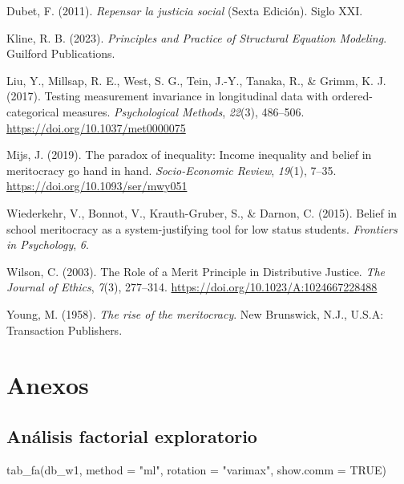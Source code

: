 \documentclass[
  12pt,
]{article}
\newenvironment{Shaded}{\begin{snugshade}}{\end{snugshade}}
\newcommand{\AttributeTok}[1]{\textcolor[rgb]{0.40,0.45,0.13}{#1}}
\newcommand{\ConstantTok}[1]{\textcolor[rgb]{0.56,0.35,0.01}{#1}}
\newcommand{\FunctionTok}[1]{\textcolor[rgb]{0.28,0.35,0.67}{#1}}
\newcommand{\NormalTok}[1]{\textcolor[rgb]{0.00,0.23,0.31}{#1}}
\newcommand{\StringTok}[1]{\textcolor[rgb]{0.13,0.47,0.30}{#1}}
\newlength{\cslhangindent}
\newenvironment{CSLReferences}[2] %
 {\begin{list}{}{%
  \setlength{\itemindent}{0pt}
  \setlength{\leftmargin}{0pt}
  \setlength{\parsep}{0pt}
  \ifodd #1
   \setlength{\leftmargin}{\cslhangindent}
   \setlength{\itemindent}{-1\cslhangindent}
  \fi
  \setlength{\itemsep}{#2\baselineskip}}}
 {\end{list}}
\begin{document}
\begin{CSLReferences}{1}{0}
Dubet, F. (2011). \emph{{Repensar la justicia social}} (Sexta
Edici{ó}n). Siglo XXI.

Kline, R. B. (2023). \emph{Principles and {Practice} of {Structural
Equation Modeling}}. Guilford Publications.

Liu, Y., Millsap, R. E., West, S. G., Tein, J.-Y., Tanaka, R., \& Grimm,
K. J. (2017). Testing measurement invariance in longitudinal data with
ordered-categorical measures. \emph{Psychological Methods},
\emph{22}(3), 486--506. \url{https://doi.org/10.1037/met0000075}

Mijs, J. (2019). The paradox of inequality: Income inequality and belief
in meritocracy go hand in hand. \emph{Socio-Economic Review},
\emph{19}(1), 7--35. \url{https://doi.org/10.1093/ser/mwy051}

Wiederkehr, V., Bonnot, V., Krauth-Gruber, S., \& Darnon, C. (2015).
Belief in school meritocracy as a system-justifying tool for low status
students. \emph{Frontiers in Psychology}, \emph{6}.

Wilson, C. (2003). The {Role} of a {Merit Principle} in {Distributive
Justice}. \emph{The Journal of Ethics}, \emph{7}(3), 277--314.
\url{https://doi.org/10.1023/A:1024667228488}

Young, M. (1958). \emph{The rise of the meritocracy}. New Brunswick,
N.J., U.S.A: Transaction Publishers.

\end{CSLReferences}

\pagebreak

\section{Anexos}\label{anexos}

\subsection{Análisis factorial
exploratorio}\label{anuxe1lisis-factorial-exploratorio}

\begin{Shaded}
\begin{Highlighting}[]
 \FunctionTok{tab\_fa}\NormalTok{(db\_w1, }\AttributeTok{method =} \StringTok{"ml"}\NormalTok{, }\AttributeTok{rotation =} \StringTok{"varimax"}\NormalTok{, }\AttributeTok{show.comm =} \ConstantTok{TRUE}\NormalTok{)}
\end{Highlighting}
\end{Shaded}
\end{document}
